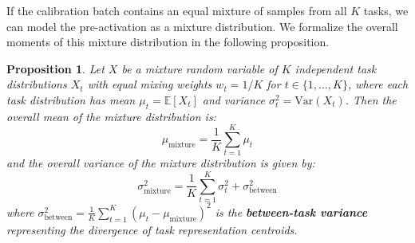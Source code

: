 \documentclass{article}
\theoremstyle{plain}
\newtheorem{proposition}[theorem]{Proposition}
\theoremstyle{definition}
\theoremstyle{remark}
\begin{document}
If the calibration batch contains an equal mixture of samples from all $K$ tasks, we can model the pre-activation as a mixture distribution. We formalize the overall moments of this mixture distribution in the following proposition.

\begin{proposition} \label{prop:mixture_variance}
Let $X$ be a mixture random variable of $K$ independent task distributions $X_t$ with equal mixing weights $w_t = 1/K$ for $t \in \{1, \dots, K\}$, where each task distribution has mean $\mu_t = \mathbb{E}[X_t]$ and variance $\sigma^2_t = \text{Var}(X_t)$. Then the overall mean of the mixture distribution is:
\begin{equation}
    \mu_{\text{mixture}} = \frac{1}{K} \sum_{t=1}^K \mu_t
\end{equation}
and the overall variance of the mixture distribution is given by:
\begin{equation}
    \sigma^2_{\text{mixture}} = \frac{1}{K} \sum_{t=1}^K \sigma^2_t + \sigma^2_{\text{between}}
\end{equation}
where $\sigma^2_{\text{between}} = \frac{1}{K} \sum_{t=1}^K (\mu_t - \mu_{\text{mixture}})^2$ is the \textbf{between-task variance} representing the divergence of task representation centroids.
\end{proposition}
\end{document}
